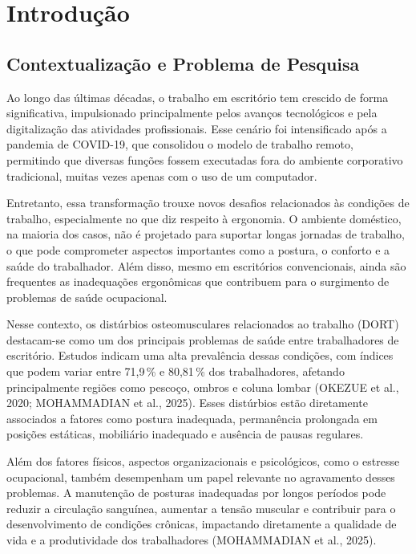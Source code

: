 \section{Introdução}
\label{sec:introducao}

\subsection{Contextualização e Problema de Pesquisa}

Ao longo das últimas décadas, o trabalho em escritório tem crescido de forma
significativa, impulsionado principalmente pelos avanços tecnológicos e pela
digitalização das atividades profissionais. Esse cenário foi intensificado após a
pandemia de COVID-19, que consolidou o modelo de trabalho remoto, permitindo que
diversas funções fossem executadas fora do ambiente corporativo tradicional,
muitas vezes apenas com o uso de um computador.

Entretanto, essa transformação trouxe novos desafios relacionados às condições de
trabalho, especialmente no que diz respeito à ergonomia. O ambiente doméstico, na
maioria dos casos, não é projetado para suportar longas jornadas de trabalho, o que
pode comprometer aspectos importantes como a postura, o conforto e a saúde do
trabalhador. Além disso, mesmo em escritórios convencionais, ainda são frequentes
as inadequações ergonômicas que contribuem para o surgimento de problemas de saúde
ocupacional.

Nesse contexto, os distúrbios osteomusculares relacionados ao trabalho (DORT)
destacam-se como um dos principais problemas de saúde entre trabalhadores de
escritório. Estudos indicam uma alta prevalência dessas condições, com índices que
podem variar entre 71,9\,\% e 80,81\,\% dos trabalhadores, afetando principalmente
regiões como pescoço, ombros e coluna lombar (OKEZUE et al., 2020; MOHAMMADIAN et
al., 2025). Esses distúrbios estão diretamente associados a fatores como postura
inadequada, permanência prolongada em posições estáticas, mobiliário inadequado e
ausência de pausas regulares.

Além dos fatores físicos, aspectos organizacionais e psicológicos, como o estresse
ocupacional, também desempenham um papel relevante no agravamento desses problemas.
A manutenção de posturas inadequadas por longos períodos pode reduzir a circulação
sanguínea, aumentar a tensão muscular e contribuir para o desenvolvimento de
condições crônicas, impactando diretamente a qualidade de vida e a produtividade
dos trabalhadores (MOHAMMADIAN et al., 2025).

